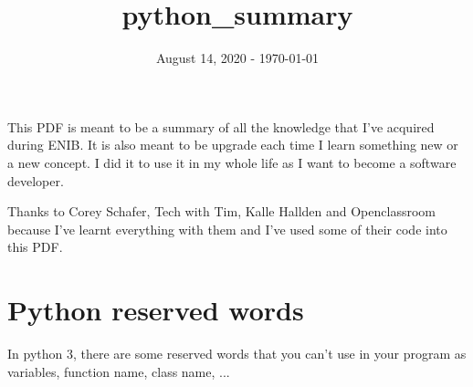 \documentclass[a4paper, 12pt, titlepage]{scrartcl} %
\title{python\_summary}
\author{}
\date{August 14, 2020 - \today}
\begin{document}
\maketitle
\newpage

This PDF is meant to be a summary of all the knowledge that I've acquired during ENIB. It is also meant to be upgrade each time I learn something new or a new concept. I did it to use it in my whole life as I want to become a software developer.

\vspace{10mm}

Thanks to Corey Schafer, Tech with Tim, Kalle Hallden and Openclassroom because I've learnt everything with them and I've used some of their code into this PDF.

\newpage

\tableofcontents

\newpage
\section{Python reserved words}
In python 3, there are some reserved words that you can't use in your program as variables, function name, class name, ...

\vspace{35mm}
\end{document}
